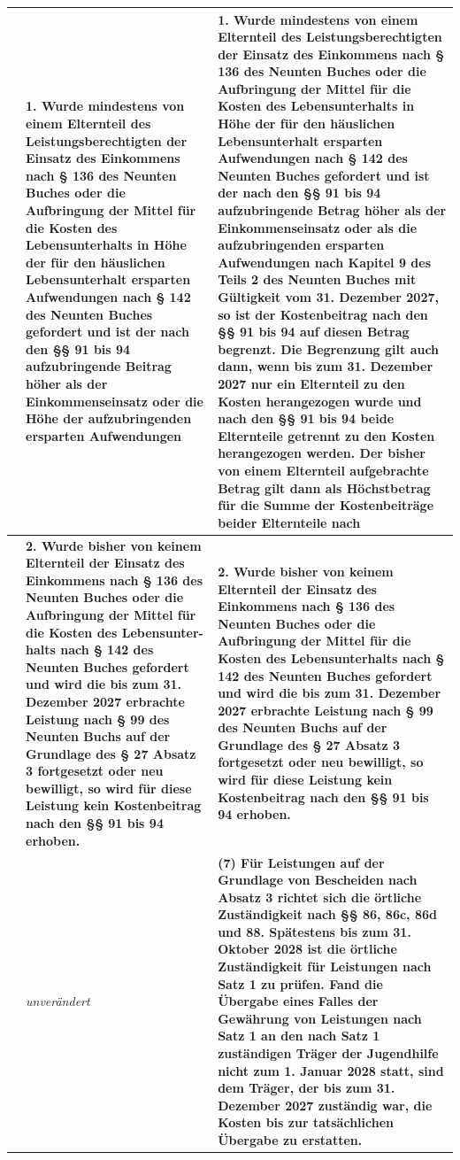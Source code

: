 \documentclass[10pt,a4paper,landscape]{article}
\begin{document}
\begin{longtable}{|L{8.6cm}|L{8.6cm}|L{8.6cm}|}
 & \textbf{1. Wurde mindestens von einem Elternteil des Leistungsberechtigten der Einsatz des Einkommens nach \S{} 136 des Neunten Buches oder die Aufbringung der Mittel für die Kosten des Lebensunterhalts in Höhe der für den häuslichen Lebensunterhalt ersparten Aufwendungen nach \S{} 142 des Neunten Buches gefordert und ist der nach den \S{}\S{} 91 bis 94 aufzubringende Beitrag höher als der Einkommenseinsatz oder die Höhe der aufzubringenden ersparten Aufwendungen } & \textbf{1. Wurde mindestens von einem Elternteil des Leistungsberechtigten der Einsatz des Einkommens nach \S{} 136 des Neunten Buches oder die Aufbringung der Mittel für die Kosten des Lebensunterhalts in Höhe der für den häuslichen Lebensunterhalt ersparten Aufwendungen nach \S{} 142 des Neunten Buches gefordert und ist der nach den \S{}\S{} 91 bis 94 aufzubringende Betrag höher als der Einkommenseinsatz oder als die aufzubringenden ersparten Aufwendungen nach Kapitel 9 des Teils 2 des Neunten Buches mit Gültigkeit vom 31. Dezember 2027, so ist der Kostenbeitrag nach den \S{}\S{} 91 bis 94 auf diesen Betrag begrenzt. Die Begrenzung gilt auch dann, wenn bis zum 31. Dezember 2027 nur ein Elternteil zu den Kosten herangezogen wurde und nach den \S{}\S{} 91 bis 94 beide Elternteile getrennt zu den Kosten herangezogen werden. Der bisher von einem Elternteil aufgebrachte Betrag gilt dann als Höchstbetrag für die Summe der Kostenbeiträge beider Elternteile nach } \\
\hline
 & \textbf{2. Wurde bisher von keinem Elternteil der Einsatz des Einkommens nach \S{} 136 des Neunten Buches oder die Aufbringung der Mittel für die Kosten des Lebensunter-halts nach \S{} 142 des Neunten Buches gefordert und wird die bis zum 31. Dezember 2027 erbrachte Leistung nach \S{} 99 des Neunten Buchs auf der Grundlage des \S{} 27 Absatz 3 fortgesetzt oder neu bewilligt, so wird für diese Leistung kein Kostenbeitrag nach den \S{}\S{} 91 bis 94 erhoben. } & \textbf{2. Wurde bisher von keinem Elternteil der Einsatz des Einkommens nach \S{} 136 des Neunten Buches oder die Aufbringung der Mittel für die Kosten des Lebensunterhalts nach \S{} 142 des Neunten Buches gefordert und wird die bis zum 31. Dezember 2027 erbrachte Leistung nach \S{} 99 des Neunten Buchs auf der Grundlage des \S{} 27 Absatz 3 fortgesetzt oder neu bewilligt, so wird für diese Leistung kein Kostenbeitrag nach den \S{}\S{} 91 bis 94 erhoben. } \\
\hline
 & \textit{unverändert} & \textbf{(7) Für Leistungen auf der Grundlage von Bescheiden nach Absatz 3 richtet sich die örtliche Zuständigkeit nach \S{}\S{} 86, 86c, 86d und 88. Spätestens bis zum 31. Oktober 2028 ist die örtliche Zuständigkeit für Leistungen nach Satz 1 zu prüfen. Fand die Übergabe eines Falles der Gewährung von Leistungen nach Satz 1 an den nach Satz 1 zuständigen Träger der Jugendhilfe nicht zum 1. Januar 2028 statt, sind dem Träger, der bis zum 31. Dezember 2027 zuständig war, die Kosten bis zur tatsächlichen Übergabe zu erstatten. } \\

\end{longtable}
\end{document}
